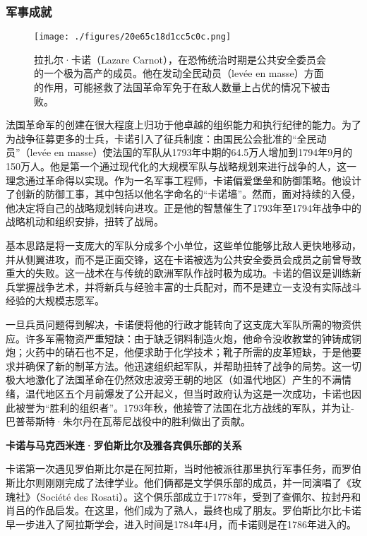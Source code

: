 \subsubsection{军事成就}
\begin{figure}[ht]
\centering
\texttt{[image: ./figures/20e65c18d1cc5c0c.png]}
\caption{拉扎尔·卡诺（Lazare Carnot），在恐怖统治时期是公共安全委员会的一个极为高产的成员。他在发动全民动员（levée en masse）方面的作用，可能拯救了法国革命军免于在敌人数量上占优的情况下被击败。} \label{fig_Lazare_2}
\end{figure}
法国革命军的创建在很大程度上归功于他卓越的组织能力和执行纪律的能力。为了为战争征募更多的士兵，卡诺引入了征兵制度：由国民公会批准的“全民动员”（levée en masse）使法国的军队从1793年中期的64.5万人增加到1794年9月的150万人。他是第一个通过现代化的大规模军队与战略规划来进行战争的人，这一理念通过革命得以实现。作为一名军事工程师，卡诺偏爱堡垒和防御策略。他设计了创新的防御工事，其中包括以他名字命名的“卡诺墙”。然而，面对持续的入侵，他决定将自己的战略规划转向进攻。正是他的智慧催生了1793年至1794年战争中的战略机动和组织安排，扭转了战局。

基本思路是将一支庞大的军队分成多个小单位，这些单位能够比敌人更快地移动，并从侧翼进攻，而不是正面交锋，这在卡诺被选为公共安全委员会成员之前曾导致重大的失败。这一战术在与传统的欧洲军队作战时极为成功。卡诺的倡议是训练新兵掌握战争艺术，并将新兵与经验丰富的士兵配对，而不是建立一支没有实际战斗经验的大规模志愿军。

一旦兵员问题得到解决，卡诺便将他的行政才能转向了这支庞大军队所需的物资供应。许多军需物资严重短缺：由于缺乏铜料制造火炮，他命令没收教堂的钟铸成铜炮；火药中的硝石也不足，他便求助于化学技术；靴子所需的皮革短缺，于是他要求并确保了新的制革方法。他迅速组织起军队，并帮助扭转了战争的局势。这一切极大地激化了法国革命在仍然效忠波旁王朝的地区（如温代地区）产生的不满情绪，温代地区五个月前爆发了公开起义，但当时政府认为这是一次成功，卡诺也因此被誉为“胜利的组织者”。1793年秋，他接管了法国在北方战线的军队，并为让-巴普蒂斯特·朱尔丹在瓦蒂尼战役中的胜利做出了贡献。

\textbf{卡诺与马克西米连·罗伯斯比尔及雅各宾俱乐部的关系 } 

卡诺第一次遇见罗伯斯比尔是在阿拉斯，当时他被派往那里执行军事任务，而罗伯斯比尔则刚刚完成了法律学业。他们俩都是文学俱乐部的成员，并一同演唱了《玫瑰社》（Société des Rosati）。这个俱乐部成立于1778年，受到了查佩尔、拉封丹和肖吕的作品启发。在这里，他们成为了熟人，最终也成了朋友。罗伯斯比尔比卡诺早一步进入了阿拉斯学会，进入时间是1784年4月，而卡诺则是在1786年进入的。

